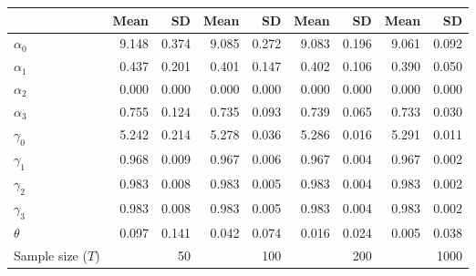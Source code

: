 
\begin{tabular}[t]{lrrrrrrrr}
\toprule
  & Mean & SD & Mean  & SD  & Mean   & SD   & Mean    & SD   \\
\midrule
$\alpha_{0}$ & 9.148 & 0.374 & 9.085 & 0.272 & 9.083 & 0.196 & 9.061 & 0.092\\
$\alpha_{1}$ & 0.437 & 0.201 & 0.401 & 0.147 & 0.402 & 0.106 & 0.390 & 0.050\\
$\alpha_{2}$ & 0.000 & 0.000 & 0.000 & 0.000 & 0.000 & 0.000 & 0.000 & 0.000\\
$\alpha_{3}$ & 0.755 & 0.124 & 0.735 & 0.093 & 0.739 & 0.065 & 0.733 & 0.030\\
$\gamma_{0}$ & 5.242 & 0.214 & 5.278 & 0.036 & 5.286 & 0.016 & 5.291 & 0.011\\
$\gamma_{1}$ & 0.968 & 0.009 & 0.967 & 0.006 & 0.967 & 0.004 & 0.967 & 0.002\\
$\gamma_{2}$ & 0.983 & 0.008 & 0.983 & 0.005 & 0.983 & 0.004 & 0.983 & 0.002\\
$\gamma_{3}$ & 0.983 & 0.008 & 0.983 & 0.005 & 0.983 & 0.004 & 0.983 & 0.002\\
$\theta$ & 0.097 & 0.141 & 0.042 & 0.074 & 0.016 & 0.024 & 0.005 & 0.038\\
Sample size ($T$) &  & 50 &  & 100 &  & 200 &  & 1000\\
\bottomrule
\end{tabular}
